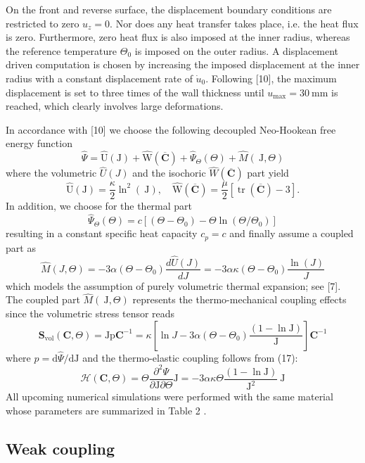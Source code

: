 On the front and reverse surface, the displacement boundary conditions are restricted to zero \(u_{z}=0\).
Nor does any heat transfer takes place, i.e. the heat flux is zero.
Furthermore, zero heat flux is also imposed at the inner radius, whereas the reference temperature \(\Theta_{0}\) is imposed on the outer radius.
A displacement driven computation is chosen by increasing the imposed displacement at the inner radius with a constant displacement rate of \(\dot{u}_{0}\).
Following [10], the maximum displacement is set to three times of the wall thickness until \(u_{\max }=30 \mathrm{~mm}\) is reached, which clearly involves large deformations.

In accordance with [10] we choose the following decoupled Neo-Hookean free energy function
\[
\hat{\Psi}=\hat{\mathrm{U}}(\mathrm{J})+\hat{\mathrm{W}}(\overline{\mathbf{C}})+\hat{\Psi}_{\Theta}(\Theta)+\hat{M}(\mathrm{~J}, \Theta)
\]
where the volumetric \(\hat{U}(J)\) and the isochoric \(\hat{W}(\overline{\mathbf{C}})\) part yield
\[
\hat{\mathrm{U}}(\mathrm{J})=\frac{\kappa}{2} \ln ^{2}(\mathrm{~J}), \quad \hat{\mathrm{W}}(\overline{\mathbf{C}})=\frac{\mu}{2}[\operatorname{tr}(\overline{\mathbf{C}})-3] .
\]
In addition, we choose for the thermal part
\[
\hat{\Psi}_{\Theta}(\Theta)=c\left[\left(\Theta-\Theta_{0}\right)-\Theta \ln \left(\Theta / \Theta_{0}\right)\right]
\]
resulting in a constant specific heat capacity \(c_{p}=c\) and finally assume a coupled part as
\[
\hat{M}(J, \Theta)=-3 \alpha\left(\Theta-\Theta_{0}\right) \frac{d \hat{U}(J)}{d J}=-3 \alpha \kappa\left(\Theta-\Theta_{0}\right) \frac{\ln (J)}{J}
\]
which models the assumption of purely volumetric thermal expansion; see [7]. The coupled part \(\hat{M}(\mathrm{~J}, \Theta)\) represents the thermo-mechanical coupling effects since the volumetric stress tensor reads
\[
\mathbf{S}_{\mathrm{vol}}(\mathbf{C}, \Theta)=\mathrm{Jp} \mathbf{C}^{-1}=\kappa\left[\ln J-3 \alpha\left(\Theta-\Theta_{0}\right) \frac{(1-\ln \mathrm{J})}{\mathrm{J}}\right] \mathbf{C}^{-1}
\]
where \(p=\mathrm{d} \hat{\Psi} / \mathrm{dJ}\) and the thermo-elastic coupling follows from (17):
\[
\mathscr{H}(\mathbf{C}, \Theta)=\Theta \frac{\partial^{2} \Psi}{\partial \mathrm{J} \partial \Theta} \mathrm{J}=-3 \alpha \kappa \Theta \frac{(1-\ln \mathrm{J})}{\mathrm{J}^{2}} \mathrm{~J}
\]
All upcoming numerical simulations were performed with the same material whose parameters are summarized in Table 2 .

\subsection{Weak coupling}


